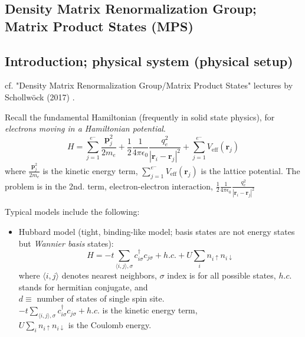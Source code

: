 \documentclass[10pt]{amsart}
\begin{document}
\begin{multicols*}{2}
\section{Density Matrix Renormalization Group; Matrix Product States (MPS)}

\subsection{Introduction; physical system (physical setup)}

cf. "Density Matrix Renormalization Group/Matrix Product States" lectures by Schollw\"{o}ck (2017) \cite{ArSo2017}.

Recall the fundamental Hamiltonian (frequently in solid state physics), for \emph{electrons moving in a Hamiltonian potential}. 
\begin{equation}
H = \sum_{j=1}^{ e^-} \frac{\mathbf{p}_j^2}{ 2m_e} + \frac{1}{2} \frac{1}{ 4\pi \epsilon_0} \frac{q_e^2}{ |\mathbf{r}_i - \mathbf{r}_j|^2 } + \sum_{j=1}^{e^-} V_{\text{eff}}(\mathbf{r}_j)
\end{equation}
where $\frac{\mathbf{p}_j^2}{ 2m_e}$ is the kinetic energy term, $\sum_{j=1}^{e^-} V_{\text{eff}}(\mathbf{r}_j)$ is the lattice potential.
The problem is in the 2nd. term, electron-electron interaction, $\frac{1}{2} \frac{1}{ 4\pi \epsilon_0} \frac{q_e^2}{ |\mathbf{r}_i - \mathbf{r}_j|^2 }$

Typical models include the following:

\begin{itemize}
	\item Hubbard model (tight, binding-like model; basis states are not energy states but \emph{Wannier basis} states):
	\begin{equation}
	H = -t \sum_{ \langle i, j \rangle, \sigma } c^{\dag}_{i \sigma} c_{j \sigma} + h.c. + U \sum_i n_{i \uparrow} n_{i \downarrow }
	\end{equation}
	where $\langle i, j \rangle$ denotes nearest neighbors, $\sigma$ index is for all possible states, $h.c.$ stands for hermitian conjugate, and \\
	$d \equiv$ number of states of single spin site. \\
	$-t \sum_{ \langle i, j \rangle, \sigma } c^{\dag}_{i \sigma} c_{j \sigma} + h.c.$ is the kinetic energy term, \\
	$U \sum_i n_{i \uparrow} n_{i \downarrow }$ is the Coulomb energy.
	

\end{itemize}
\end{multicols*}
\end{document}
